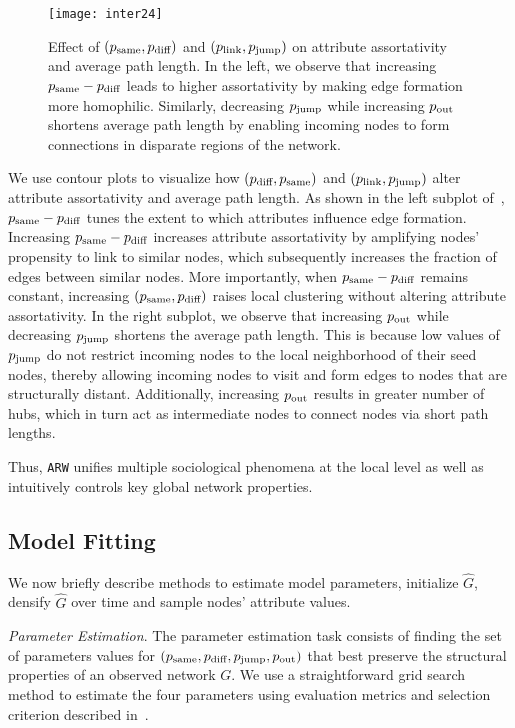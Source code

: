 \begin{figure}
 \centering
 \texttt{[image: inter24]}
 \caption{
 	Effect of $(p_{\scriptsize\mbox{same}}, p_{\scriptsize\mbox{diff}})$ and $(p_{\scriptsize\mbox{link}}, p_{\scriptsize\mbox{jump}})$ on attribute assortativity
	and average path length.
	In the left, we observe that
 	increasing $p_{\scriptsize\mbox{same}}-p_{\scriptsize\mbox{diff}}$ leads to higher assortativity by making edge formation more homophilic.
	Similarly, decreasing $p_{\scriptsize\mbox{jump}}$ while increasing $p_{\scriptsize\mbox{out}}$ shortens average path length
 	by enabling incoming nodes to form connections in disparate regions of the network.
 }
 \label{fig:inter2}
\end{figure}

We use contour plots to visualize how $(p_{\scriptsize\mbox{diff}}, p_{\scriptsize\mbox{same}})$
and $(p_{\scriptsize\mbox{link}}, p_{\scriptsize\mbox{jump}})$ alter attribute assortativity and average path length.
As shown in the left subplot of~, $p_{\scriptsize\mbox{same}}-p_{\scriptsize\mbox{diff}}$ tunes the extent to which
attributes influence edge formation. Increasing $p_{\scriptsize\mbox{same}}-p_{\scriptsize\mbox{diff}}$ increases
attribute assortativity by amplifying nodes' propensity to link to similar
nodes, which subsequently increases the fraction of edges between similar
nodes. More importantly, when $p_{\scriptsize\mbox{same}}-p_{\scriptsize\mbox{diff}}$ remains constant, increasing
$(p_{\scriptsize\mbox{same}}, p_{\scriptsize\mbox{diff}})$ raises local clustering without altering attribute
assortativity. In the right subplot, we observe that increasing $p_{\scriptsize\mbox{out}}$ while
decreasing $p_{\scriptsize\mbox{jump}}$ shortens the average path length. This is because low
values of $p_{\scriptsize\mbox{jump}}$ do not restrict incoming nodes to the local neighborhood
of their seed nodes,
thereby allowing incoming nodes to visit and form edges to nodes that are
structurally distant. Additionally, increasing $p_{\scriptsize\mbox{out}}$ results in greater number of hubs,
which in turn act as intermediate nodes to connect nodes via short path
lengths.

Thus,
\texttt{ARW} unifies multiple sociological phenomena at the local level
as well as intuitively controls key global network properties.

\subsection{Model Fitting}
\label{sub:Model Fitting}

We now briefly describe methods to estimate model parameters,
initialize $\hat{G}$, densify $\hat{G}$ over time and sample nodes' attribute values.

\textit{Parameter Estimation}.
The parameter estimation task consists of finding the set of parameters values
for $(p_{\scriptsize\mbox{same}}, p_{\scriptsize\mbox{diff}}, p_{\scriptsize\mbox{jump}}, p_{\scriptsize\mbox{out}})$ that best preserve the structural properties of an
observed network $G$. We use a straightforward grid search method to estimate
the four parameters using evaluation metrics and selection criterion described in~.

